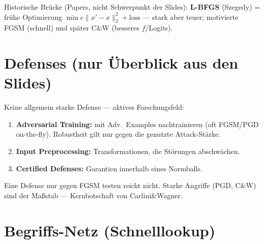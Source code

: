 \documentclass[11pt,a4paper]{article}
\begin{document}
\vspace{0.35em}
Historische Brücke (Papers, nicht Schwerpunkt der Slides):
\textbf{L-BFGS} (Szegedy) = frühe Optimierung $\min c\|x'-x\|_2^2+\mathrm{loss}$ ---
stark aber teuer; motivierte FGSM (schnell) und später C\&W (besseres $f$/Logits).

\section{Defenses (nur Überblick aus den Slides)}

Keine allgemein starke Defense --- aktives Forschungsfeld:
\begin{enumerate}
  \item \textbf{Adversarial Training:} mit Adv.\ Examples nachtrainieren
        (oft FGSM/PGD on-the-fly). Robustheit gilt nur gegen die genutzte Attack-Stärke.
  \item \textbf{Input Preprocessing:} Transformationen, die Störungen abschwächen.
  \item \textbf{Certified Defenses:} Garantien innerhalb eines Normballs.
\end{enumerate}

\begin{warnbox}
Eine Defense nur gegen FGSM testen reicht nicht.
Starke Angriffe (PGD, C\&W) sind der Maßstab --- Kernbotschaft von Carlini\&Wagner.
\end{warnbox}

\section{Begriffs-Netz (Schnelllookup)}
\end{document}
